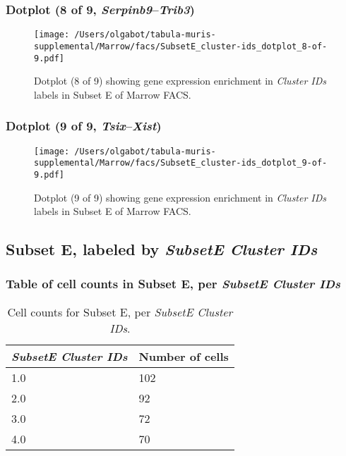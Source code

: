 \clearpage

\subsubsection{Dotplot (8 of 9, \emph{Serpinb9}--\emph{Trib3})}
\begin{figure}[h]
\centering
\texttt{[image: /Users/olgabot/tabula-muris-supplemental/Marrow/facs/SubsetE\_cluster-ids\_dotplot\_8-of-9.pdf]}

\caption{ Dotplot (8 of 9)  showing gene expression enrichment in \emph{Cluster IDs} labels in Subset E of Marrow FACS. }
\end{figure}


\clearpage

\subsubsection{Dotplot (9 of 9, \emph{Tsix}--\emph{Xist})}
\begin{figure}[h]
\centering
\texttt{[image: /Users/olgabot/tabula-muris-supplemental/Marrow/facs/SubsetE\_cluster-ids\_dotplot\_9-of-9.pdf]}

\caption{ Dotplot (9 of 9)  showing gene expression enrichment in \emph{Cluster IDs} labels in Subset E of Marrow FACS. }
\end{figure}


\clearpage

\subsection{Subset E, labeled by \emph{SubsetE Cluster IDs}}
\subsubsection{Table of cell counts in Subset E, per \emph{SubsetE Cluster IDs}}\begin{table}[h]
\centering
\label{my-label}
\begin{tabular}{@{}ll@{}}
\toprule

\emph{SubsetE Cluster IDs}& Number of cells \\ \midrule
1.0 & 102 \\

2.0 & 92 \\

3.0 & 72 \\

4.0 & 70 \\
\bottomrule
\end{tabular}
\caption{Cell counts for Subset E, per \emph{SubsetE Cluster IDs}.}
\end{table}

